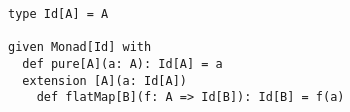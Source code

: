 \begin{algorithm}

\begin{verbatim}
type Id[A] = A
      
given Monad[Id] with
  def pure[A](a: A): Id[A] = a
  extension [A](a: Id[A])
    def flatMap[B](f: A => Id[B]): Id[B] = f(a)
\end{verbatim}

\caption{Identity monad in Scala %
\label{monad:id}}
\end{algorithm}